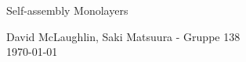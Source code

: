 \documentclass[11pt, a4paper]{article}
\begin{document}
\begin{center}

        {\huge Self-assembly Monolayers}
    \vspace{0.1cm}

      	{David McLaughlin, Saki Matsuura - Gruppe 138} \\
      	{\today}
    \vspace{-0.2cm}

\end{center}





\end{document}
